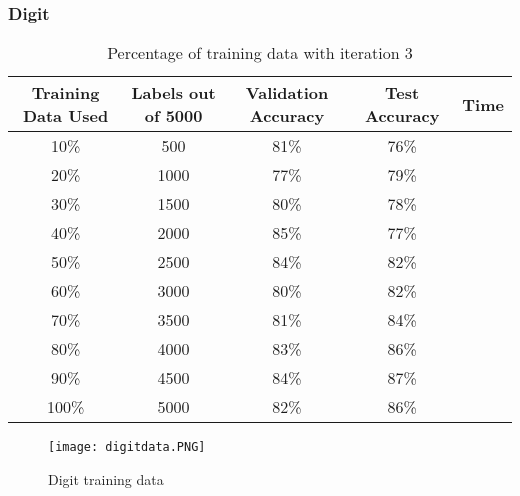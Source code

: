 \documentclass{article}
\begin{document}
        \subsubsection{Digit}
            \begin{table}[h]
                \centering
                \begin{tabular}{c|c|c|c|c}
                    \hline
                        Training Data Used & Labels out of 5000 & Validation Accuracy & Test Accuracy & Time\\
                    \hline
                        10\% & 500 & 81\% & 76\%\\
                    \hline
                        20\% & 1000 & 77\% & 79\%\\
                    \hline
                        30\% & 1500 & 80\% & 78\%\\
                    \hline
                        40\% & 2000 & 85\% & 77\%\\
                    \hline
                        50\% & 2500 & 84\% & 82\%\\
                    \hline
                        60\% & 3000 & 80\% & 82\%\\
                    \hline
                        70\% & 3500 & 81\% & 84\%\\
                    \hline
                        80\% & 4000 & 83\% & 86\%\\
                    \hline
                        90\% & 4500 & 84\% & 87\%\\
                    \hline
                        100\% & 5000 & 82\% & 86\%\\
                    \hline
                \end{tabular}
                \caption{Percentage of training data with iteration 3}
            \end{table}
            \newpage
            \begin{figure}[h]
                \centering
                    \texttt{[image: digitdata.PNG]}
                \caption{Digit training data}
            \end{figure}
        
\end{document}
